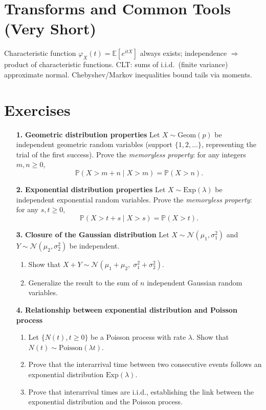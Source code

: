 \documentclass[11pt]{article}
\newcommand{\Pbb}{\mathbb{P}}
\newcommand{\E}{\mathbb{E}}
\newcommand{\1}{\mathbf{1}}
\begin{document}
\section{Transforms and Common Tools (Very Short)}
Characteristic function $\varphi_X(t)=\E[e^{itX}]$ always exists; independence $\Rightarrow$ product of characteristic functions. CLT: sums of i.i.d.\ (finite variance) approximate normal. Chebyshev/Markov inequalities bound tails via moments.

\newpage

\section*{Exercises}

\begin{enumerate}
  \item[\textbf{1.}] \textbf{Geometric distribution properties}  
  Let $X \sim \mathrm{Geom}(p)$ be independent geometric random variables (support $\{1,2,\dots\}$, representing the trial of the first success).  Prove the \emph{memoryless property}: for any integers $m,n \geq 0$,
    \[
      \Pbb(X>m+n \mid X>m) = \Pbb(X>n).
    \]

  \item[\textbf{2.}] \textbf{Exponential distribution properties}  
  Let $X \sim \mathrm{Exp}(\lambda)$ be independent exponential random variables.  Prove the \emph{memoryless property}: for any $s,t\geq 0$,
    \[
      \Pbb(X>t+s \mid X>s) = \Pbb(X>t).
    \]

  \item[\textbf{3.}] \textbf{Closure of the Gaussian distribution}  
  Let $X\sim \mathcal{N}(\mu_1,\sigma_1^2)$ and $Y\sim \mathcal{N}(\mu_2,\sigma_2^2)$ be independent.  
  \begin{enumerate}[label=(\alph*)]
    \item Show that $X+Y \sim \mathcal{N}(\mu_1+\mu_2,\;\sigma_1^2+\sigma_2^2)$.  
    \item Generalize the result to the sum of $n$ independent Gaussian random variables.
  \end{enumerate}

  \item[\textbf{4.}] \textbf{Relationship between exponential distribution and Poisson process}  
  \begin{enumerate}[label=(\alph*)]
    \item Let $\{N(t), t\geq 0\}$ be a Poisson process with rate $\lambda$. Show that $N(t)\sim \mathrm{Poisson}(\lambda t)$.  
    \item Prove that the interarrival time between two consecutive events follows an exponential distribution $\mathrm{Exp}(\lambda)$.  
    \item Prove that interarrival times are i.i.d., establishing the link between the exponential distribution and the Poisson process.
  \end{enumerate}
\end{enumerate}
\end{document}
